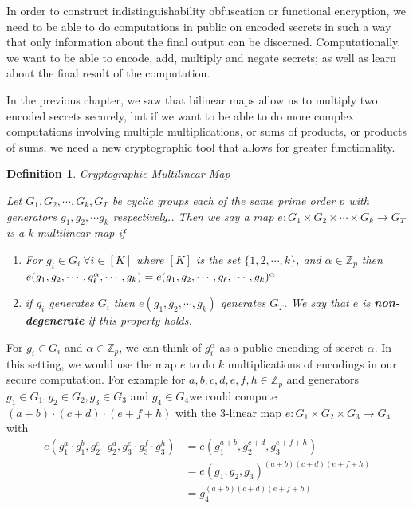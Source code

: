 \documentclass[12pt,twoside]{reedthesis}
\newtheorem{definition}{Definition}
\newcommand{\Z}[0]{\mathbb{Z}}
\begin{document}
    In order to construct indistinguishability obfuscation or functional encryption, we need to be able to do computations in public on encoded secrets in such a way that only information about the final output can be discerned. Computationally, we want to be able to encode, add, multiply and negate secrets; as well as learn about the final result of the computation.
    \par In the previous chapter, we saw that bilinear maps allow us to multiply two encoded secrets securely, but if we want to be able to do more complex computations involving multiple multiplications, or sums of products, or products of sums, we need a new cryptographic tool that allows for greater functionality.
    \begin{definition}{Cryptographic Multilinear Map}
    \par Let $G_1,G_2, \cdots, G_k,G_T$ be cyclic groups each of the same prime order $p$ with generators $g_1,g_2,\cdots g_k$ respectively.. Then we say a map $e:G_1 \times G_2 \times \cdots \times G_k \rightarrow G_T$ is a k-multilinear map if
    
    \begin{enumerate}
    \item For $g_i \in G_i \: \forall i \in [K]$ where $[K]$ is the set $\{1,2,\cdots,k \}$, and $\alpha \in \mathbb{Z}_p$ then $e(g_1, g_2, \cdots,g_\ell^\alpha , \cdots , g_k) =e(g_1, g_2, \cdots, g_\ell , \cdots , g_k)^\alpha \\$
    \item if $g_i$ generates $G_i$ then $e(g_1,g_2,\cdots , g_k)$ generates $G_T$. We say that $e$ is \textbf{non-degenerate} if this property holds.
    \end{enumerate}
    \end{definition}
       
       For $g_i \in G_i$ and $\alpha \in \Z_p$, we can think of $g_i^\alpha$ as a public encoding of secret $\alpha$. In this setting, we would use the map $e$ to do $k$ multiplications of encodings in our secure computation. For example for $a,b,c,d,e,f,h \in \Z_p$ and generators $g_1 \in G_1, g_2\in G_2, g_3\in G_3$ and $g_4 \in G_4$we could compute $(a+b)\cdot(c+d)\cdot(e+f+h)$ with the $3$-linear map $e:G_1\times G_2 \times G_3 \to G_4$ with 
 \begin{align*}      
 e(g_1^a \cdot g_1^b,g_2^c\cdot g_2^d,g_3^e\cdot g_3^f \cdot g_3^h)&=e(g_1^{a +b},g_2^{c+d},g_3^{e+f+h})\\
 &= e(g_1,g_2,g_3)^{(a+b)(c+d)(e+f+h)} \\
 &=g_4^{(a+b)(c+d)(e+f+h)}
 \end{align*}
 
\end{document}
